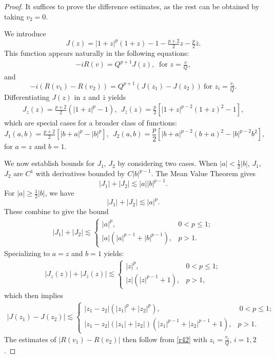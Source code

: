\documentclass[12pt]{amsart}
\newcommand{\lsm}{\lesssim}
\begin{document}
\begin{proof}
It suffices to prove the difference estimates, as the rest can be obtained by taking  $v_2=0$.

We introduce 
\[
J(z)=|1+z|^p(1+z)-1-\tfrac{p+2}2 z-\tfrac p2 \bar z.
\]
This function appears naturally in the following equations: 
\begin{align}\label{r4}
-iR(v)=Q^{p+1}J(z),\ \mbox{ for } z=\tfrac vQ, 
\end{align}
and 
\[
-i(R(v_1)-R(v_2))=Q^{p+1}(J(z_1)-J(z_2)) \ \mbox{for } z_i=\tfrac{v_i}Q.
\]
Differentiating $J(z)$ in $z$ and $\bar z$ yields
\begin{align*}
J_z(z)=\tfrac{p+2}2(|1+z|^p-1), \ \ J_{\bar z}(z)=\tfrac p2[ |1+z|^{p-2}(1+z)^2-1], 
\end{align*}
which are special cases for a broader class of functions:
\[
J_1(a, b)=\tfrac{p+2}2[|b+a|^p-|b|^p], \ \ J_2(a,b)=\frac p2[|b+a|^{p-2}(b+a)^2-|b|^{p-2}b^2],
\]
for $a=z$ and $b=1$. 

We now establish bounds for $J_1$, $J_2$ by considering two cases. When $|a|<\frac 12|b|$, $J_1$, $J_2$ are $C^1$ with derivatives bounded by $C|b|^{p-1}$. The Mean Value Theorem gives 
\[
|J_1|+|J_2|\lsm |a| |b|^{p-1}. 
\]
For $|a|\ge \frac 12 |b|$, we have  
\[
|J_1|+|J_2|\lsm |a|^p. 
\]
These combine to give the bound
\begin{align}\label{r6}
|J_1|+|J_2|\lsm \begin{cases}
|a|^p, & 0 < p\le 1;\\
|a|(|a|^{p-1}+|b|^{p-1}), & p>1. 
\end{cases}
\end{align}
Specializing to $a=z$ and $b=1$ yields:
\begin{align}\label{r41}
|J_z(z)|+|J_{\bar z}(z)|\lsm \begin{cases}
|z|^p, & 0<p\le 1;\\
|z|(|z|^{p-1}+1), & p>1,
\end{cases}
\end{align}
which then implies 
\begin{align}\label{r42}
|J(z_1)-J(z_2)|\lsm \begin{cases}
|z_1-z_2|(|z_1|^p+|z_2|^p), &\ 0<p\le 1;\\
|z_1-z_2|(|z_1|+|z_2|)(|z_1|^{p-1}+|z_2|^{p-1}+1), & p>1.
\end{cases}
\end{align}
The estimates of $|R(v_1)-R(v_2)|$ then follow from \eqref{r42} with $z_i=\tfrac{v_i}Q$, $i=1,2$.


\end{proof}
\end{document}
